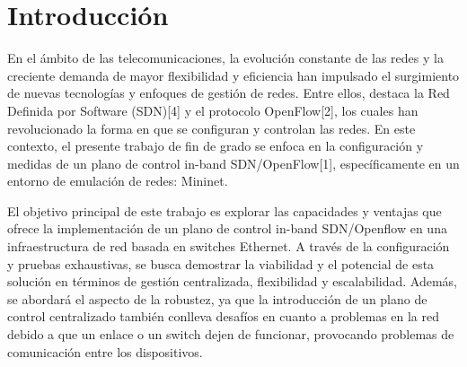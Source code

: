 \documentclass[a4paper, 12pt]{book}
\begin{document}
	
	
	\tableofcontents 
	\cleardoublepage
	\listoffigures %
	
	
	
	\clearpage
	\chapter{Introducción}
	\label{sec:intro} %
	
	
	En el ámbito de las telecomunicaciones, la evolución constante de las redes y la creciente demanda de mayor flexibilidad y eficiencia han impulsado el surgimiento de nuevas tecnologías y enfoques de gestión de redes. Entre ellos, destaca la Red Definida por Software (SDN)[4] y el protocolo OpenFlow[2], los cuales han revolucionado la forma en que se configuran y controlan las redes. En este contexto, el presente trabajo de fin de grado se enfoca en la configuración y medidas de un plano de control in-band SDN/OpenFlow[1], específicamente en un entorno de emulación de redes: Mininet.
	
	El objetivo principal de este trabajo es explorar las capacidades y ventajas que ofrece la implementación de un plano de control in-band SDN/Openflow en una infraestructura de red basada en switches Ethernet. A través de la configuración y pruebas exhaustivas, se busca demostrar la viabilidad y el potencial de esta solución en términos de gestión centralizada, flexibilidad y escalabilidad. Además, se abordará el aspecto de la robustez, ya que la introducción de un plano de control centralizado también conlleva desafíos en cuanto a problemas en la red debido a que un enlace o un switch dejen de funcionar, provocando problemas de comunicación entre los dispositivos.
	
\end{document}
